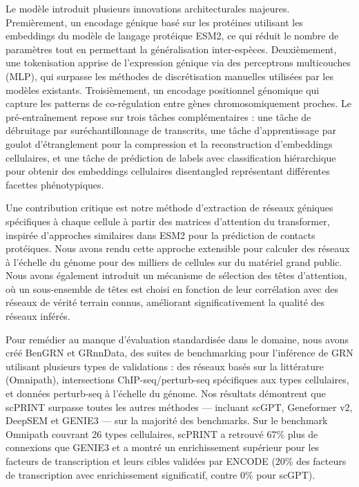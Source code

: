 Le modèle introduit plusieurs innovations architecturales majeures. Premièrement, un encodage génique basé sur les protéines utilisant les embeddings du modèle de langage protéique ESM2, ce qui réduit le nombre de paramètres tout en permettant la généralisation inter-espèces. Deuxièmement, une tokenisation apprise de l'expression génique via des perceptrons multicouches (MLP), qui surpasse les méthodes de discrétisation manuelles utilisées par les modèles existants. Troisièmement, un encodage positionnel génomique qui capture les patterns de co-régulation entre gènes chromosomiquement proches. Le pré-entraînement repose sur trois tâches complémentaires : une tâche de débruitage par suréchantillonnage de transcrits, une tâche d'apprentissage par goulot d'étranglement pour la compression et la reconstruction d'embeddings cellulaires, et une tâche de prédiction de labels avec classification hiérarchique pour obtenir des embeddings cellulaires disentangled représentant différentes facettes phénotypiques.

Une contribution critique est notre méthode d'extraction de réseaux géniques spécifiques à chaque cellule à partir des matrices d'attention du transformer, inspirée d'approches similaires dans ESM2 pour la prédiction de contacts protéiques. Nous avons rendu cette approche extensible pour calculer des réseaux à l'échelle du génome pour des milliers de cellules sur du matériel grand public. Nous avons également introduit un mécanisme de sélection des têtes d'attention, où un sous-ensemble de têtes est choisi en fonction de leur corrélation avec des réseaux de vérité terrain connus, améliorant significativement la qualité des réseaux inférés.

Pour remédier au manque d'évaluation standardisée dans le domaine, nous avons créé BenGRN et GRnnData, des suites de benchmarking pour l'inférence de GRN utilisant plusieurs types de validations : des réseaux basés sur la littérature (Omnipath), intersections ChIP-seq/perturb-seq spécifiques aux types cellulaires, et données perturb-seq à l'échelle du génome. Nos résultats démontrent que scPRINT surpasse toutes les autres méthodes — incluant scGPT, Geneformer v2, DeepSEM et GENIE3 — sur la majorité des benchmarks. Sur le benchmark Omnipath couvrant 26 types cellulaires, scPRINT a retrouvé 67\% plus de connexions que GENIE3 et a montré un enrichissement supérieur pour les facteurs de transcription et leurs cibles validées par ENCODE (20\% des facteurs de transcription avec enrichissement significatif, contre 0\% pour scGPT).

